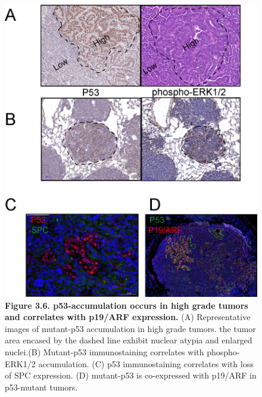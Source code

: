 \begin{figure}
\hypertarget{fig:3.6}{%
\centering
\includegraphics[width=1\textwidth,height=\textheight]{images/p53_5.png}
\caption{\textbf{Figure 3.6. p53-accumulation occurs in high grade tumors and correlates with p19/ARF expression.} (A) Representative images of mutant-p53 accumulation in high grade tumors. the tumor area encased by the dashed line exhibit nuclear atypia and enlarged nuclei.(B) Mutant-p53 immunostaining correlates with phospho-ERK1/2 accumulation. (C) p53 immunostaining correlates with loss of SPC expression. (D) mutant-p53 is co-expressed with p19/ARF in p53-mutant tumors.}\label{fig:3.6}
}
\end{figure}

